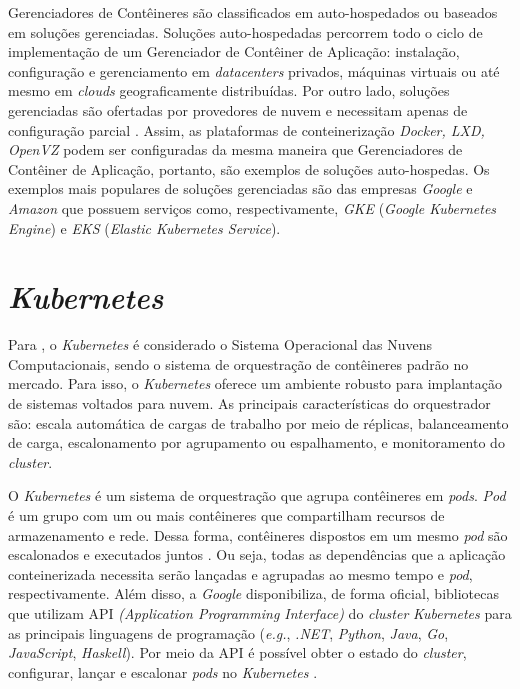 Gerenciadores de Contêineres são classificados em auto-hospedados ou baseados em soluções gerenciadas. Soluções auto-hospedadas percorrem todo o ciclo de implementação de um Gerenciador de Contêiner de Aplicação: instalação, configuração e gerenciamento em \textit{datacenters} privados, máquinas virtuais ou até mesmo em \textit{clouds} geograficamente distribuídas. Por outro lado, soluções gerenciadas são ofertadas por provedores de nuvem e necessitam apenas de configuração parcial \cite{casalicchio2020state}. Assim, as plataformas de conteinerização \textit{Docker, LXD, OpenVZ} podem ser configuradas da mesma maneira que Gerenciadores de Contêiner de Aplicação, portanto, são exemplos de soluções auto-hospedas. Os exemplos mais populares de soluções gerenciadas são das empresas \textit{Google} e \textit{Amazon} que possuem serviços como, respectivamente, \textit{GKE} (\textit{Google Kubernetes Engine}) e \textit{EKS} (\textit{Elastic Kubernetes Service}).

\section{\textit{Kubernetes}}
Para , o \textit{Kubernetes} é considerado o Sistema Operacional das Nuvens Computacionais, sendo o sistema de orquestração de contêineres padrão no mercado. Para isso, o \textit{Kubernetes} oferece um ambiente robusto para implantação de sistemas voltados para nuvem. As principais características do orquestrador são: escala automática de cargas de trabalho por meio de réplicas, balanceamento de carga, escalonamento por agrupamento ou espalhamento, e monitoramento do \textit{cluster}.

O \textit{Kubernetes} é um sistema de orquestração que agrupa contêineres em \textit{pods}. \textit{Pod} é um grupo com um ou mais contêineres que compartilham recursos de armazenamento e rede. Dessa forma, contêineres dispostos em um mesmo \textit{pod} são escalonados e executados juntos \cite{Google}. Ou seja, todas as dependências que a aplicação conteinerizada necessita serão lançadas e agrupadas ao mesmo tempo e \textit{pod}, respectivamente. Além disso, a \textit{Google} disponibiliza, de forma oficial, bibliotecas que utilizam API \textit{(Application Programming Interface)} do \textit{cluster} \textit{Kubernetes}  para as principais linguagens de programação (\textit{e.g.}, \textit{.NET}, \textit{Python}, \textit{Java}, \textit{Go}, \textit{JavaScript}, \textit{Haskell}). Por meio da API é possível obter o estado do \textit{cluster}, configurar, lançar e escalonar \textit{pods} no \textit{Kubernetes} \cite{KubernetesAPI}.


